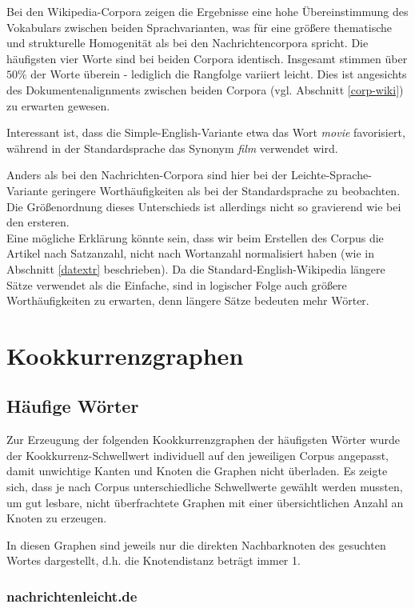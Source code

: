 \documentclass[11pt, a4paper]{article}
\begin{document}
Bei den Wikipedia-Corpora zeigen die Ergebnisse eine hohe Übereinstimmung des
Vokabulars zwischen beiden Sprachvarianten, was für eine größere thematische
und strukturelle Homogenität als bei den Nachrichtencorpora spricht.
Die häufigsten vier Worte sind bei beiden Corpora identisch.
Insgesamt stimmen über $50\%$ der Worte überein - lediglich die Rangfolge
variiert leicht.
Dies ist angesichts des Dokumentenalignments zwischen beiden Corpora (vgl.
Abschnitt \ref{corp-wiki}) zu erwarten gewesen.

Interessant ist, dass die Simple-English-Variante etwa das Wort \textit{movie}
favorisiert, während in der Standardsprache das Synonym \textit{film} verwendet
wird.

Anders als bei den Nachrichten-Corpora sind hier bei der Leichte-Sprache-Variante
geringere Worthäufigkeiten als bei der Standardsprache zu beobachten.
Die Größenordnung dieses Unterschieds ist allerdings nicht so gravierend wie bei
den ersteren.\\
Eine mögliche Erklärung könnte sein, dass wir beim Erstellen des Corpus die
Artikel nach Satzanzahl, nicht nach Wortanzahl normalisiert haben (wie in
Abschnitt \ref{datextr} beschrieben).
Da die Standard-English-Wikipedia längere Sätze verwendet als die Einfache,
sind in logischer Folge auch größere Worthäufigkeiten zu erwarten, denn längere
Sätze bedeuten mehr Wörter.



\section{Kookkurrenzgraphen}

\subsection{Häufige Wörter}

Zur Erzeugung der folgenden Kookkurrenzgraphen der häufigsten Wörter
wurde der Kookkurrenz-Schwellwert individuell auf den jeweiligen Corpus
angepasst, damit unwichtige Kanten und Knoten die Graphen nicht überladen.
Es zeigte sich, dass je nach Corpus unterschiedliche Schwellwerte gewählt werden
mussten, um gut lesbare, nicht überfrachtete Graphen mit einer übersichtlichen
Anzahl an Knoten zu erzeugen.

In diesen Graphen sind jeweils nur die direkten Nachbarknoten des gesuchten
Wortes dargestellt, d.h. die Knotendistanz beträgt immer 1.

\subsubsection{nachrichtenleicht.de}
\end{document}
